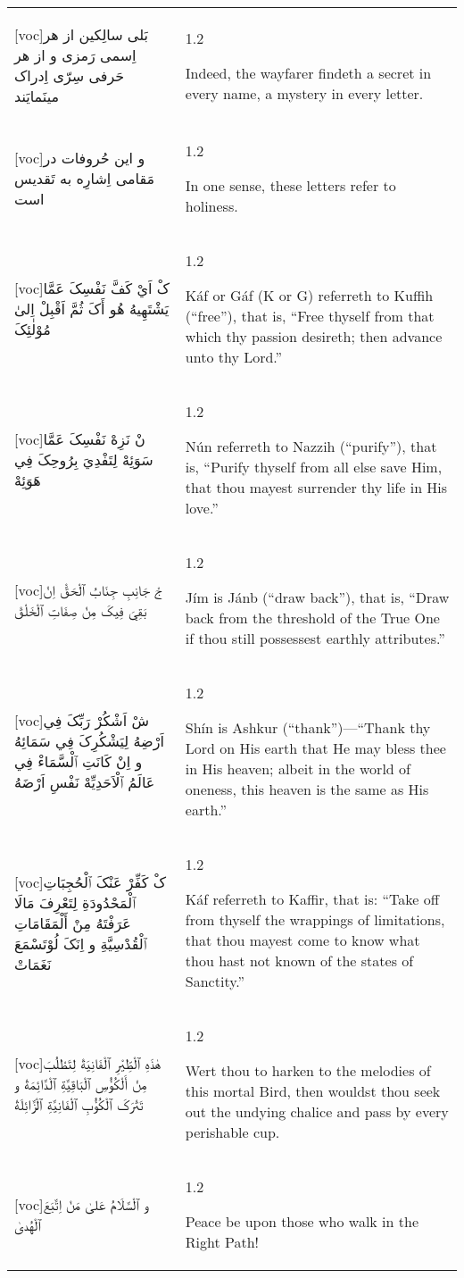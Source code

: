 \documentclass[11pt]{article}
\makeatletter
\newenvironment{orig}
  {\begin{farsi}[voc]}
  {\end{farsi}}
\newenvironment{trans}
  {\large\begin{spacing}{1.2}\raggedright}
  {\end{spacing}}
\newenvironment{word}
  {\begin{longtable}[t]{p{3in}@{\hspace{3em}}p{2.5in}}}
  {\end{longtable}}
\newcommand{\ayat}[2]{
  \begin{orig}#1\end{orig} &
  \vspace{1.5ex}\begin{trans}#2\end{trans} \vspace{-2ex}\\
}
\makeatother
\begin{document}
\begin{word}
\ayat{بَلی سالِکين از هر اِسمی رَمزی و از هر حَرفی سِرّی اِدراک مينَمايَند}
     {Indeed, the wayfarer findeth a secret in every name, a mystery in every letter.}

\ayat{و اين حُروفات در مَقامی اِشارِه به تَقديس است}
     {In one sense, these letters refer to holiness.}

\ayat{کْ اَيْ کَفَّ نَفْسِکَ عَمَّا يَشْتَهِيهُ هُو أَکَ ثُمَّ اَقْبِلْ اِلىٰ مُوْلٰئِکَ}
     {Káf or Gáf (K or G) referreth to Kuffih (“free”), that is, “Free thyself from that which thy passion desireth; then advance unto thy Lord.”}

\ayat{نْ نَزِهْ نَفْسِکَ عَمَّا سَوَئِهْ لِتَفْدِيَ بِرُوحِکَ فِي هَوَئِهْ}
     {Nún referreth to Nazzih (“purify”), that is, “Purify thyself from all else save Him, that thou mayest surrender thy life in His love.”}

\ayat{جْ جَانِبِ جِنَابُ ٱلْحَقّْ اِنْ بَقِيَ فِيکَ مِنْ صِفَاتِ ٱلْخَلْقْ}
     {Jím is Jánb (“draw back”), that is, “Draw back from the threshold of the True One if thou still possessest earthly attributes.”}

\ayat{شْ اَشْکُرْ رَبِّکَ فِي اَرْضِهُ لِيَشْکُرِکَ فِي سَمَائِهُ و اِنْ کَانَتِ ٱلْسَّمَاءْ فِي عَالَمُ ٱلْاَحَدِيِّهْ نَفْسِ اَرْضَهُ}
     {Shín is Ashkur (“thank”)—“Thank thy Lord on His earth that He may bless thee in His heaven; albeit in the world of oneness, this heaven is the same as His earth.”}

\ayat{کْ کَفِّرْ عَنْکَ ٱلْحُجِبَاتِ ٱلْمَحْدُودَةِ لِتَعْرِفَ مَالَا عَرَفْتَهُ مِنْ أَلْمَقَامَاتِ ٱلْقُدْسِيَّةِ و اِنَکَ لُوْتَسْمَعَ نَغَمَاتْ}
     {Káf referreth to Kaffir, that is: “Take off from thyself the wrappings of limitations, that thou mayest come to know what thou hast not known of the states of Sanctity.”}

\ayat{هٰذَهِ ٱلْطِّيْرِ ٱلْفَانِيَةْ لِتَطْلُبَ مِنْ أَلْکُؤُسِ ٱلْبَاقِيَّةِ ٱلْدَّائِمَةْ و تَتْرَکَ ٱلْکُؤُبِ ٱلْفَانِيَّةِ ٱلْزَّائِلَةْ}
     {Wert thou to harken to the melodies of this mortal Bird, then wouldst thou seek out the undying chalice and pass by every perishable cup.}

\ayat{و ٱلْسَّلَامُ عَلىٰ مَنْ اِتَّبَعَ ٱلْهُدىٰ}
     {Peace be upon those who walk in the Right Path!}
\end{word}
\end{document}
